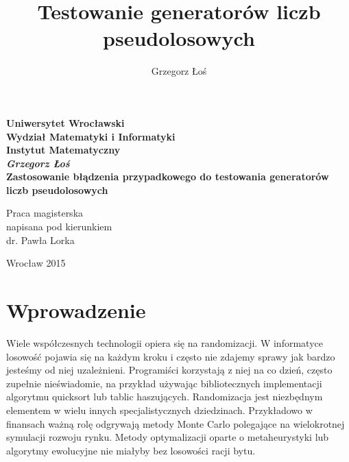 \documentclass[a4paper,11pt,twoside]{book}
\title{Testowanie generatorów liczb pseudolosowych}
\author{Grzegorz Łoś}
\theoremstyle{definition}
\begin{document}
\thispagestyle{empty}
\begin{center}
\textbf{\large Uniwersytet Wrocławski\\
Wydział Matematyki i Informatyki\\
Instytut Matematyczny}\\
\vspace{4cm}
\textbf{\textit{\large Grzegorz Łoś}\\
\vspace{0.5cm}
{\Large Zastosowanie błądzenia przypadkowego do testowania generatorów liczb pseudolosowych}}\\
\end{center}
\vspace{3cm}
{\large \hspace*{6.5cm}Praca magisterska\\
\hspace*{6.5cm}napisana pod kierunkiem\\
\hspace*{6.5cm}dr. Pawła Lorka }\\
\vfill
\begin{center}
{\large Wrocław 2015}\\
\end{center}

\newpage
\thispagestyle{empty}
\begin{minipage}{0.5\linewidth}
\end{minipage}

\newpage


\begin{minipage}{0.8\linewidth}
\tableofcontents
\end{minipage}

\chapter*{Wprowadzenie}
Wiele współczesnych technologii opiera się na randomizacji. W informatyce losowość pojawia się na każdym kroku i często nie zdajemy sprawy jak bardzo jesteśmy od niej uzależnieni. Programiści korzystają z niej na co dzień, często zupełnie nieświadomie, na przykład używając bibliotecznych implementacji algorytmu quicksort lub tablic haszujących. Randomizacja jest niezbędnym elementem w wielu innych specjalistycznych dziedzinach. Przykładowo w finansach ważną rolę odgrywają metody Monte Carlo polegające na wielokrotnej symulacji rozwoju rynku. Metody optymalizacji oparte o metaheurystyki lub algorytmy ewolucyjne nie miałyby bez losowości racji bytu.
\end{document}
